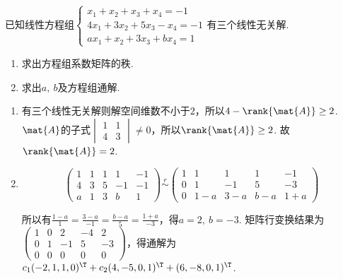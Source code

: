 \begin{problem}
    已知线性方程组$\begin{cases}
        x_1+x_2+x_3+x_4=-1\\
        4x_1+3x_2+5x_3-x_4=-1\\
        ax_1+x_2+3x_3+bx_4=1
    \end{cases}$有三个线性无关解.
\begin{enumerate}
    \item 求出方程组系数矩阵的秩.
    \item 求出$a,\ b$及方程组通解.
\end{enumerate}
\end{problem}
\begin{solution}
\begin{enumerate}
    \item 有三个线性无关解则解空间维数不小于$2$，所以$4-\rank{\mat{A}}\geq 2$. $\mat{A}$的子式$\begin{vmatrix}
        1 & 1\\4 & 3
    \end{vmatrix}\neq 0$，所以$\rank{\mat{A}}\geq 2$. 故$\rank{\mat{A}}=2$.
    \item 
    \[\begin{pmatrix}
        1 & 1 & 1 & 1 & -1\\
        4 & 3 & 5 & -1 & -1\\
        a & 1 & 3 & b & 1
    \end{pmatrix}\overset{r}{\sim}\begin{pmatrix}
        1 & 1 & 1 & 1 & -1\\
        0 & 1 & -1 & 5 & -3\\
        0 & 1-a & 3-a & b-a & 1+a
    \end{pmatrix}\]

    所以有$\frac{1-a}{1}=\frac{3-a}{-1}=\frac{b-a}{5}=\frac{1+a}{-3}$，得$a=2,\ b=-3$. 矩阵行变换结果为$\begin{pmatrix}
        1 & 0 & 2 & -4 & 2\\
        0 & 1 & -1 & 5 & -3\\
        0 & 0 & 0 & 0 & 0
    \end{pmatrix}$，得通解为$c_1(-2,1,1,0)^\T+c_2(4,-5,0,1)^\T+(6,-8,0,1)^\T$.
\end{enumerate}
\end{solution}

